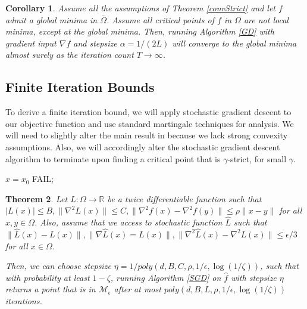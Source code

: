 \documentclass[11pt]{article}
\newtheorem{theorem}{Theorem}[section]
\newtheorem{corollary}[theorem]{Corollary}
\newcommand{\N}{{\mathbb{N}}}
\newcommand{\R}{{\mathbb{R}}}
\begin{document}
\begin{corollary}
Assume all the assumptions of Theorem \ref{convStrict} and let $f$ admit a global minima in $\overline{\Omega}$. Assume all critical points of $f$ in $\Omega$ are not local minima, except at the global minima. Then, running Algorithm \ref{GD} with gradient input $\nabla f$ and stepsize $\alpha = 1/(2L)$ will converge to the global minima almost surely as the iteration count $T \to\infty$.
\end{corollary}

\subsection{Finite Iteration Bounds} 

To derive a finite iteration bound, we will apply stochastic gradient descent to our objective function and use standard martingale techniques for analysis. We will need to slightly alter the main result in \cite{GeHJY15} because we lack strong convexity assumptions. Also, we will accordingly alter the stochastic gradient descent algorithm to terminate upon finding a critical point that is $\gamma$-strict, for small $\gamma$.


\begin{algorithm}[ht]
\SetAlgoLined
\KwIn{$\widehat{L}:\mathcal{M} \to \R$; $x_0 \in \mathcal{M}$; $T\in \N$; $\alpha \in \R$; $\epsilon\in\R$}
 
  $x = x_0$\;
  {\Return FAIL;}
  
  
 \caption{$x = SGD(\widehat{L}, x_0, T,\alpha,\epsilon$)}
 \label{SGD}
\end{algorithm}


\begin{theorem}\label{strongConverge}
Let $L :\Omega \to \R$ be a twice differentiable function such that $|L(x)| \leq B, \|\nabla^2 L(x)\| \leq C,\|\nabla^2f(x) -\nabla^2f(y)\| \leq \rho\|x - y\|$ for all $x,y\in\Omega$. Also, assume that we access to stochastic function $\widehat{L}$ such that $\|\widehat{L}(x) -L(x)\|, \|\nabla \widehat{L}(x) = L(x)\|, \|\nabla^2\widehat{L}(x) -\nabla^2 L(x)\| \leq \epsilon/3$ for all $x\in \Omega$.



Then, we can choose stepsize $\eta = 1/poly(d,B,C,\rho,1/\epsilon,\log(1/\zeta))$, such that with probability at least $1-\zeta$, running Algorithm \ref{SGD} on $\widehat{f}$ with stepsize $\eta$  returns a point that is in $\mathcal{M}_\epsilon$ after at most $poly(d,B,L,\rho,1/\epsilon, \log(1/\zeta))$ iterations.
\end{theorem}
\end{document}
